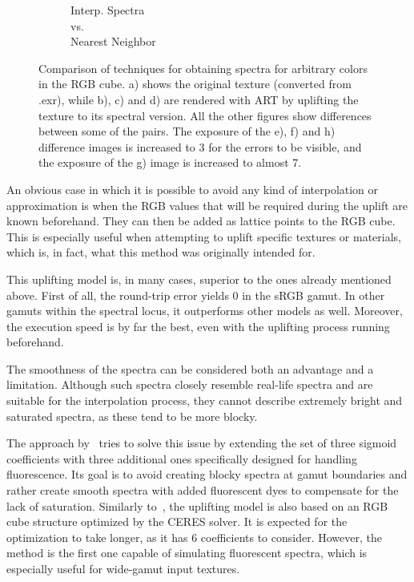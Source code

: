 \begin{figure}[t]
\begin{subfigure}[t]{0.22\textwidth}
		\caption{Interp. Spectra\\vs.\\Nearest Neighbor}
		\label{fig:sigDiffSpectraNeighbor}
	\end{subfigure}
	\caption{Comparison of techniques for obtaining spectra for arbitrary colors in the RGB cube. a) shows the original texture (converted from .exr), while b), c) and d) are rendered with ART by uplifting the texture to its spectral version. All the other figures show differences between some of the pairs. The exposure of the e), f) and h) difference images is increased to 3 for the errors to be visible, and the exposure of the g) image is increased to almost 7.}
	\label{fig:sigmoidTexture}
\end{figure}

An obvious case in which it is possible to avoid any kind of interpolation or approximation is when the RGB values that will be required during the uplift are known beforehand. They can then be added as lattice points to the RGB cube. This is especially useful when attempting to uplift specific textures or materials, which is, in fact, what this method was originally intended for.

This uplifting model is, in many cases, superior to the ones already mentioned above. First of all, the round-trip error yields 0 in the sRGB gamut. In other gamuts within the spectral locus, it outperforms other models as well. Moreover, the execution speed is by far the best, even with the uplifting process running beforehand. 

The smoothness of the spectra can be considered both an advantage and a limitation. Although such spectra closely resemble real-life spectra and are suitable for the interpolation process, they cannot describe extremely bright and saturated spectra, as these tend to be more blocky.

The approach by~\citet{upsamplingFluorescence} tries to solve this issue by extending the set of three sigmoid coefficients with three additional ones specifically designed for handling fluorescence. Its goal is to avoid creating blocky spectra at gamut boundaries and rather create smooth spectra with added fluorescent dyes to compensate for the lack of saturation. Similarly to~\citet{upsamplingJakobHanika}, the uplifting model is also based on an RGB cube structure optimized by the CERES solver. It is expected for the optimization to take longer, as it has 6 coefficients to consider. However, the method is the first one capable of simulating fluorescent spectra, which is especially useful for wide-gamut input textures. 

